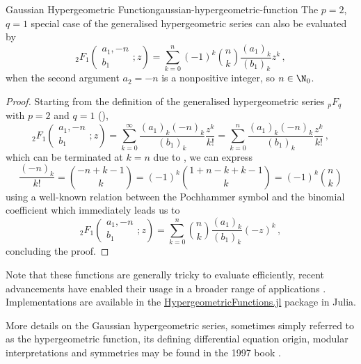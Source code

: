 \begin{lemma}{Gaussian Hypergeometric Function}{gaussian-hypergeometric-function}
  The $p=2$, $q=1$ special case of the generalised hypergeometric series can also be evaluated by
  $${}_2F_1\left(\begin{matrix}a_{1}, -n \\b_{1}\end{matrix}; z\right) = \sum_{k=0}^n (-1)^k \binom{n}{k} \frac{(a_1)_k}{(b_1)_k}z^k\,,$$
  when the second argument $a_2 = -n$ is a nonpositive integer, so $n \in \N_0$.
\end{lemma}
\begin{proof}
  Starting from the definition of the generalised hypergeometric series ${}_pF_q$ with $p=2$ and $q=1$ (),
  $${}_2F_1\left(\begin{matrix}a_{1}, -n \\b_{1}\end{matrix}; z\right) = \sum_{k=0}^{\infty} \frac{(a_1)_k (-n)_k}{(b_1)_k} \frac{z^k}{k!} = \sum_{k=0}^{n} \frac{(a_1)_k (-n)_k}{(b_1)_k} \frac{z^k}{k!}\,,$$
  which can be terminated at $k=n$ due to , we can express
  $$\frac{(-n)_k}{k!} = \binom{-n+k-1}{k} = (-1)^k \binom{1+n-k+k-1}{k} = (-1)^k \binom{n}{k}$$
  using a well-known relation between the Pochhammer symbol and the binomial coefficient \parencite{2001-pochhammer-binomial-relation,2018-nist} which immediately leads us to
  $${}_2F_1\left(\begin{matrix}a_{1}, -n \\b_{1}\end{matrix}; z\right) = \sum_{k=0}^n \binom{n}{k} \frac{(a_1)_k}{(b_1)_k}(-z)^k\,,$$
  concluding the proof.
\end{proof}

Note that these functions are generally tricky to evaluate efficiently, recent advancements have enabled their usage in a broader range of applications \parencite{2008-hypergeometric-functions-jl-1,2017-hypergeometric-functions-jl-2,2023-hypergeometric-functions-jl-3}.
Implementations are available in the \href{https://github.com/JuliaMath/HypergeometricFunctions.jl}{HypergeometricFunctions.jl} package in Julia.

More details on the Gaussian hypergeometric series, sometimes simply referred to as the hypergeometric function, its defining differential equation origin, modular interpretations and symmetries may be found in the 1997 book  \parencite{1997-hypergeometric-functions-my-love}.
